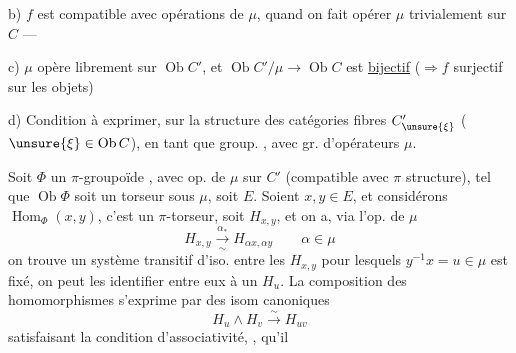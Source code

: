 b)  $f$ est compatible avec opérations de $\mu$,
quand on fait opérer $\mu$ trivialement sur $C$ ---

c) $\mu$ opère librement sur $\operatorname{Ob}C'$, et
$\operatorname{Ob}C'/\mu\longrightarrow\operatorname{Ob}C$
est \uline{bijectif} ($\Rightarrow f$ surjectif sur les objets)

d)  Condition à exprimer, sur la
structure des catégories fibres $C'_{\unsure{\xi}}$ ($\unsure{\xi}\in\operatorname{Ob}C$),
en tant que \inserted{$\pi$-}group. , avec gr.
d'opérateurs $\mu$.

Soit $\Phi$  un $\pi$-groupoïde , avec op.
de $\mu$ sur $C'$ (compatible avec $\pi$
structure), tel que $\operatorname{Ob}\Phi$ soit un
torseur sous $\mu$, soit $E$. Soient $x,y\in E$,
et considérons $\operatorname{Hom}_{\Phi}(x,y)$, c'est un
$\pi$-torseur, soit $H_{x,y}$, et on a, via l'op.
de $\mu$
\[
H_{x,y}\xrightarrow[\sim]{\alpha_*}H_{\alpha x,\alpha y}
\qquad\alpha\in\mu
\]
on trouve un système transitif d'iso. entre
les $H_{x,y}$ pour lesquels $y^{-1}x=u\in\mu$
est fixé, on peut les identifier entre
eux à un $H_u$.  La composition
des homomorphismes s'exprime par des
isom canoniques
\[
H_u\mathbin{\wedge}H_v\xrightarrow{\sim}H_{uv}
\]
satisfaisant la condition d'associativité, , qu'il
